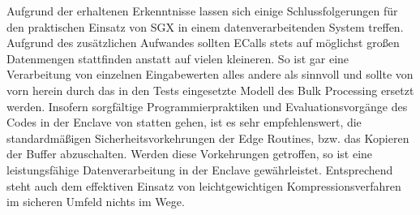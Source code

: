 Aufgrund der erhaltenen Erkenntnisse lassen sich einige Schlussfolgerungen für den praktischen Einsatz von \ac{SGX} in einem datenverarbeitenden System treffen. Aufgrund des zusätzlichen Aufwandes sollten \acp{ECall} stets auf möglichst großen Datenmengen stattfinden anstatt auf vielen kleineren. So ist gar eine Verarbeitung von einzelnen Eingabewerten alles andere als sinnvoll und sollte von vorn herein durch das in den Tests eingesetzte Modell des Bulk Processing ersetzt werden. Insofern sorgfältige Programmierpraktiken und Evaluationsvorgänge des Codes in der Enclave von statten gehen, ist es sehr empfehlenswert, die standardmäßigen Sicherheitsvorkehrungen der Edge Routines, bzw. das Kopieren der Buffer abzuschalten. Werden diese Vorkehrungen getroffen, so ist eine leistungsfähige Datenverarbeitung in der Enclave gewährleistet. Entsprechend steht auch dem effektiven Einsatz von leichtgewichtigen Kompressionsverfahren im sicheren Umfeld nichts im Wege.